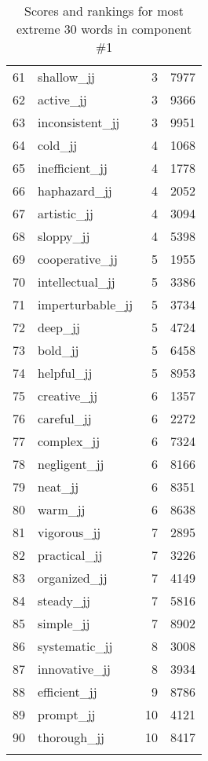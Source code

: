 \begin{longtable}[!htbp]{| rlr@{.}l |}
    61 & shallow\_jj & 3 & 7977 \\
    62 & active\_jj & 3 & 9366 \\
    63 & inconsistent\_jj & 3 & 9951 \\
    64 & cold\_jj & 4 & 1068 \\
    65 & inefficient\_jj & 4 & 1778 \\
    66 & haphazard\_jj & 4 & 2052 \\
    67 & artistic\_jj & 4 & 3094 \\
    68 & sloppy\_jj & 4 & 5398 \\
    69 & cooperative\_jj & 5 & 1955 \\
    70 & intellectual\_jj & 5 & 3386 \\
    71 & imperturbable\_jj & 5 & 3734 \\
    72 & deep\_jj & 5 & 4724 \\
    73 & bold\_jj & 5 & 6458 \\
    74 & helpful\_jj & 5 & 8953 \\
    75 & creative\_jj & 6 & 1357 \\
    76 & careful\_jj & 6 & 2272 \\
    77 & complex\_jj & 6 & 7324 \\
    78 & negligent\_jj & 6 & 8166 \\
    79 & neat\_jj & 6 & 8351 \\
    80 & warm\_jj & 6 & 8638 \\
    81 & vigorous\_jj & 7 & 2895 \\
    82 & practical\_jj & 7 & 3226 \\
    83 & organized\_jj & 7 & 4149 \\
    84 & steady\_jj & 7 & 5816 \\
    85 & simple\_jj & 7 & 8902 \\
    86 & systematic\_jj & 8 & 3008 \\
    87 & innovative\_jj & 8 & 3934 \\
    88 & efficient\_jj & 9 & 8786 \\
    89 & prompt\_jj & 10 & 4121 \\
    90 & thorough\_jj & 10 & 8417 \\
    \hline
    \caption{Scores and rankings for most extreme 30 words in component \#1} \\
\end{longtable}
